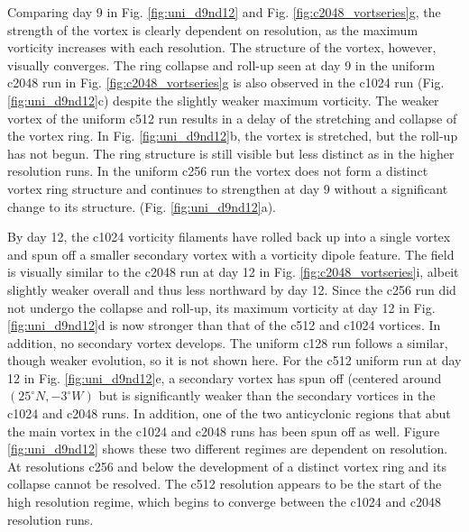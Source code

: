 \documentclass{ametsoc}
\begin{document}
Comparing day 9 in Fig. \ref{fig:uni_d9nd12} and Fig. \ref{fig:c2048_vortseries}g,
the strength of the vortex is clearly dependent on resolution, as the maximum vorticity
increases with each resolution. The structure of the vortex, however, visually 
converges. The ring collapse and roll-up seen at day 9 in the 
uniform c2048 run in Fig. \ref{fig:c2048_vortseries}g
is also observed in the c1024 run (Fig. \ref{fig:uni_d9nd12}c) 
despite the slightly weaker maximum vorticity.
The weaker vortex of the uniform c512 run results in a delay of the 
stretching and collapse of the vortex ring. In Fig. \ref{fig:uni_d9nd12}b,
the vortex is stretched, but the roll-up has not begun. The ring
structure is still visible but less distinct as in the higher resolution runs.
In the uniform c256 run the vortex does not form a distinct vortex ring structure 
and continues to strengthen at day 9 without a significant
change to its structure. (Fig. \ref{fig:uni_d9nd12}a).

By day 12, the c1024 vorticity filaments have rolled back up into a single vortex and spun off
a smaller secondary vortex with a vorticity dipole feature. The field is visually
similar to the c2048 run at day 12 in Fig. \ref{fig:c2048_vortseries}i, 
albeit slightly weaker overall and thus less northward by day 12. 
Since the c256 run did not undergo the collapse and roll-up,
its maximum vorticity at day 12 in Fig. \ref{fig:uni_d9nd12}d is now stronger 
than that of the c512 and c1024 vortices.  In addition, no secondary vortex develops.
The uniform c128 run follows a similar, though weaker evolution, so it is not shown here. 
For the c512 uniform run at day 12 in Fig. \ref{fig:uni_d9nd12}e, a secondary vortex has spun off 
(centered around $(25^\circ N, -3^\circ W)$ but is significantly weaker than the secondary vortices 
in the c1024 and c2048 runs. In addition, one of the two anticyclonic regions that abut the main 
vortex in the c1024 and c2048 runs has been spun off as well. Figure \ref{fig:uni_d9nd12}
shows these two different regimes are dependent on resolution. At resolutions c256 and below
the development of a distinct vortex ring and its collapse cannot be resolved. The c512
resolution appears to be the start of the high resolution regime, 
which begins to converge between the c1024 and c2048 resolution runs.
\end{document}
